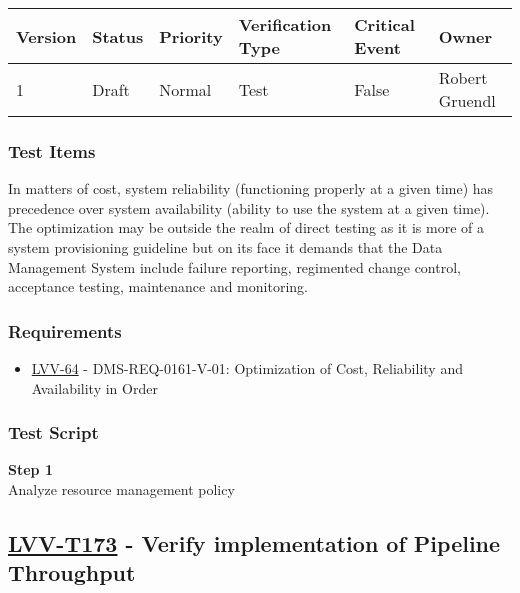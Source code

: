 \begin{longtable}[]{@{}llllll@{}}
\toprule
Version & Status & Priority & Verification Type & Critical Event &
Owner\tabularnewline
\midrule
\endhead
1 & Draft & Normal & Test & False & Robert Gruendl\tabularnewline
\bottomrule
\end{longtable}

\subsubsection{Test Items}\label{test-items-36}

In matters of cost, system reliability (functioning properly at a given
time) has precedence over system availability (ability to use the system
at a given time). ~ The optimization may be outside the realm of direct
testing as it is more of a system provisioning guideline but on its face
it demands that the Data Management System include failure reporting,
regimented change control, acceptance testing, maintenance and
monitoring.

\subsubsection{Requirements}\label{requirements-36}

\begin{itemize}
\tightlist
\item
  \href{https://jira.lsstcorp.org/browse/LVV-64}{LVV-64} -
  DMS-REQ-0161-V-01: Optimization of Cost, Reliability and Availability
  in Order
\end{itemize}

\subsubsection{Test Script}\label{test-script-36}

\textbf{Step 1}\\
Analyze resource management policy\\[2\baselineskip]

\hypertarget{lvv-t173---verify-implementation-of-pipeline-throughput}{\subsection{\texorpdfstring{\href{https://jira.lsstcorp.org/secure/Tests.jspa\#/testCase/LVV-T173}{LVV-T173}
- Verify implementation of Pipeline
Throughput}{LVV-T173 - Verify implementation of Pipeline Throughput}}\label{lvv-t173---verify-implementation-of-pipeline-throughput}}

